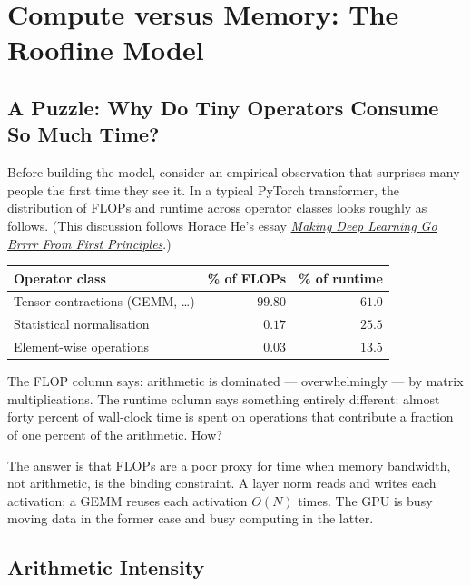 \documentclass[11pt,a4paper]{article}
\theoremstyle{definition}
\theoremstyle{remark}
\theoremstyle{plain}
\begin{document}
\section{Compute versus Memory: The Roofline Model}

\subsection{A Puzzle: Why Do Tiny Operators Consume So Much Time?}

Before building the model, consider an empirical observation that
surprises many people the first time they see it. In a typical
PyTorch transformer, the distribution of FLOPs and runtime across
operator classes looks roughly as follows. (This discussion follows
Horace He's essay \href{https://horace.io/brrr_intro.html}{\textit{Making
Deep Learning Go Brrrr From First Principles}}.)

\begin{center}
\renewcommand{\arraystretch}{1.25}
\begin{tabular}{@{}lrr@{}}
\toprule
\textbf{Operator class}       & \textbf{\% of FLOPs} & \textbf{\% of runtime} \\
\midrule
Tensor contractions (GEMM, \dots)   & $99.80$ & $61.0$ \\
Statistical normalisation           & $\phantom{0}0.17$ & $25.5$ \\
Element-wise operations             & $\phantom{0}0.03$ & $13.5$ \\
\bottomrule
\end{tabular}
\end{center}

The FLOP column says: arithmetic is dominated --- overwhelmingly ---
by matrix multiplications. The runtime column says something
entirely different: almost forty percent of wall-clock time is spent
on operations that contribute a fraction of one percent of the
arithmetic. How?

The answer is that FLOPs are a poor proxy for time when memory
bandwidth, not arithmetic, is the binding constraint. A layer norm
reads and writes each activation; a GEMM reuses each activation
$O(N)$ times. The GPU is busy moving data in the former case and
busy computing in the latter.

\subsection{Arithmetic Intensity}
\end{document}
